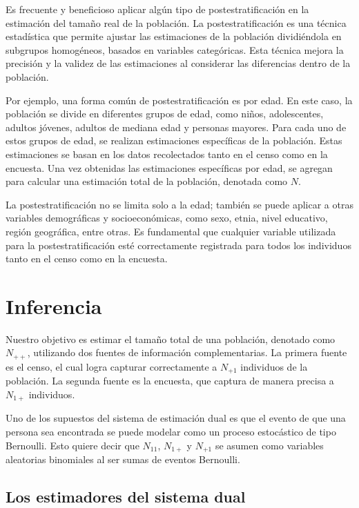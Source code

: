\documentclass[
  12pt,
]{book}
\begin{document}
Es frecuente y beneficioso aplicar algún tipo de postestratificación en la estimación del tamaño real de la población. La postestratificación es una técnica estadística que permite ajustar las estimaciones de la población dividiéndola en subgrupos homogéneos, basados en variables categóricas. Esta técnica mejora la precisión y la validez de las estimaciones al considerar las diferencias dentro de la población.

Por ejemplo, una forma común de postestratificación es por edad. En este caso, la población se divide en diferentes grupos de edad, como niños, adolescentes, adultos jóvenes, adultos de mediana edad y personas mayores. Para cada uno de estos grupos de edad, se realizan estimaciones específicas de la población. Estas estimaciones se basan en los datos recolectados tanto en el censo como en la encuesta. Una vez obtenidas las estimaciones específicas por edad, se agregan para calcular una estimación total de la población, denotada como \(N\).

La postestratificación no se limita solo a la edad; también se puede aplicar a otras variables demográficas y socioeconómicas, como sexo, etnia, nivel educativo, región geográfica, entre otras. Es fundamental que cualquier variable utilizada para la postestratificación esté correctamente registrada para todos los individuos tanto en el censo como en la encuesta.

\hypertarget{inferencia}{%
\section{Inferencia}\label{inferencia}}

Nuestro objetivo es estimar el tamaño total de una población, denotado como \(N_{++}\), utilizando dos fuentes de información complementarias. La primera fuente es el censo, el cual logra capturar correctamente a \(N_{+1}\) individuos de la población. La segunda fuente es la encuesta, que captura de manera precisa a \(N_{1+}\) individuos.

Uno de los supuestos del sistema de estimación dual es que el evento de que una persona sea encontrada se puede modelar como un proceso estocástico de tipo Bernoulli. Esto quiere decir que \(N_{11}\), \(N_{1+}\) y \(N_{+1}\) se asumen como variables aleatorias binomiales al ser sumas de eventos Bernoulli.

\hypertarget{los-estimadores-del-sistema-dual}{%
\subsection{Los estimadores del sistema dual}\label{los-estimadores-del-sistema-dual}}
\end{document}

